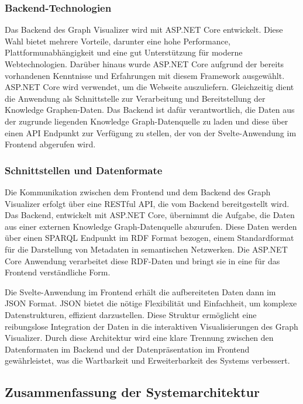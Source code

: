 \subsubsection{Backend-Technologien}

Das Backend des Graph Visualizer wird mit ASP.NET Core entwickelt. Diese Wahl bietet mehrere Vorteile, darunter eine hohe Performance, Plattformunabhängigkeit und eine gut Unterstützung für moderne Webtechnologien. Darüber hinaus wurde ASP.NET Core aufgrund der bereits vorhandenen Kenntnisse und Erfahrungen mit diesem Framework ausgewählt. ASP.NET Core wird verwendet, um die Webseite auszuliefern. Gleichzeitig dient die Anwendung als Schnittstelle zur Verarbeitung und Bereitstellung der Knowledge Graphen-Daten. Das Backend ist dafür verantwortlich, die Daten aus der zugrunde liegenden Knowledge Graph-Datenquelle zu laden und diese über einen \ac{API} Endpunkt zur Verfügung zu stellen, der von der Svelte-Anwendung im Frontend abgerufen wird.

\subsubsection{Schnittstellen und Datenformate}

Die Kommunikation zwischen dem Frontend und dem Backend des Graph Visualizer erfolgt über eine RESTful \acs{API}, die vom Backend bereitgestellt wird. Das Backend, entwickelt mit ASP.NET Core, übernimmt die Aufgabe, die Daten aus einer externen Knowledge Graph-Datenquelle abzurufen. Diese Daten werden über einen \ac{SPARQL} Endpunkt im \ac{RDF} Format bezogen, einem Standardformat für die Darstellung von Metadaten in semantischen Netzwerken. Die ASP.NET Core Anwendung verarbeitet diese RDF-Daten und bringt sie in eine für das Frontend verständliche Form.

Die Svelte-Anwendung im Frontend erhält die aufbereiteten Daten dann im \ac{JSON} Format. \ac{JSON} bietet die nötige Flexibilität und Einfachheit, um komplexe Datenstrukturen, effizient darzustellen. Diese Struktur ermöglicht eine reibungslose Integration der Daten in die interaktiven Visualisierungen des Graph Visualizer. Durch diese Architektur wird eine klare Trennung zwischen den Datenformaten im Backend und der Datenpräsentation im Frontend gewährleistet, was die Wartbarkeit und Erweiterbarkeit des Systems verbessert.

\subsection{Zusammenfassung der Systemarchitektur}

